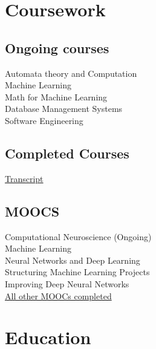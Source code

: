 \documentclass[]{karthik_sama}
\begin{document}
\begin{minipage}[t]{0.33\textwidth}
\section{Coursework}
\noindent{\color{hr}\rule{5cm}{0.4pt}}
\subsection{Ongoing courses}
Automata theory and Computation\\
Machine Learning\\
Math for Machine Learning\\
Database Management Systems\\
Software Engineering 
\begingroup \renewcommand\baselinestretch{1.5}\subsection{Completed Courses}
\href{https://drive.google.com/file/d/1K62NvFlYC0u1oTgYgRi4-djtt6LelUNc/view?usp=sharing}{\faHandORight \space Transcript}
\endgroup

\begingroup \renewcommand\baselinestretch{1.5}\subsection{MOOCS}
Computational Neuroscience {\scriptsize(Ongoing)}\\
Machine Learning
\href{https://www.coursera.org/account/accomplishments/certificate/N5QW492YV7JP}{\faExternalLink}\\
Neural Networks and Deep Learning
\href{https://www.coursera.org/account/accomplishments/certificate/3VHZ3WCVM7PJ}{\faExternalLink}\\
Structuring Machine Learning Projects
\href{https://www.coursera.org/account/accomplishments/certificate/9UZNHSKKS6DZ}{\faExternalLink}\\
Improving Deep Neural Networks
\href{https://www.coursera.org/account/accomplishments/certificate/XKUNVU2PMN6P}{\faExternalLink}\\
\href{}{\faHandORight \space All other MOOCs completed}
\endgroup
\sectionsep

\section{Education} 
\noindent{\color{hr}\rule{5cm}{0.4pt}}\\

\end{minipage}
\end{document}
